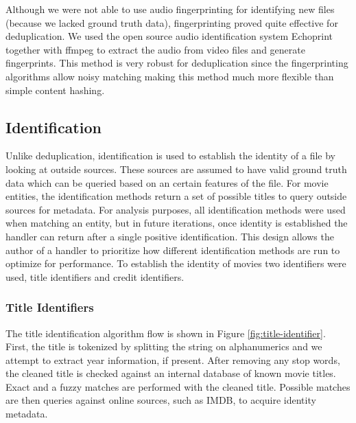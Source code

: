 \documentclass[paper=a4, fontsize=11pt]{scrartcl} %
\numberwithin{equation}{section} %
\numberwithin{figure}{section} %
\numberwithin{table}{section} %
\begin{document}
Although we were not able to use audio fingerprinting for identifying new files (because we lacked ground truth data), fingerprinting proved quite effective for deduplication. We used the open source audio identification system Echoprint together with ffmpeg to extract the audio from video files and generate fingerprints. This method is very robust for deduplication since the fingerprinting algorithms allow noisy matching making this method much more flexible than simple content hashing. \\



\subsection{Identification}
\label{sec:identification}
Unlike deduplication, identification is used to establish the identity of a file by looking at outside sources. These sources are assumed to have valid ground truth data which can be queried based on an certain features of the file. For movie entities, the identification methods return a set of possible titles to query outside sources for metadata. For analysis purposes, all identification methods were used when matching an entity, but in future iterations, once identity is established the handler can return after a single positive identification. This design allows the author of a handler to prioritize how different identification methods are run to optimize for performance. To establish the identity of movies two identifiers were used, title identifiers and credit identifiers. \\

\subsubsection{Title Identifiers}
\label{sec:title-identifier}

The title identification algorithm flow is shown in Figure \ref{fig:title-identifier}. First, the title is tokenized by splitting the string on alphanumerics and we attempt to extract year information, if present. After removing any stop words, the cleaned title is checked against an internal database of known movie titles. Exact and a fuzzy matches are performed with the cleaned title. Possible matches are then queries against online sources, such as IMDB, to acquire identity metadata. \\
\end{document}
